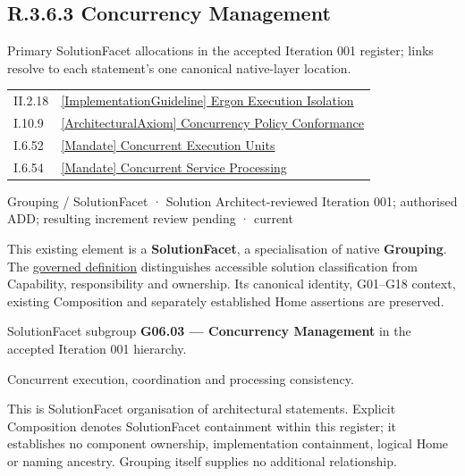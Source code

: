 \subsection*{R.3.6.3 Concurrency Management}
\label{navigation:R.3.6.3}

Primary SolutionFacet allocations in the accepted Iteration 001 register; links resolve to each statement’s one canonical native-layer location.\par
\begin{longtable}{p{.22\linewidth}p{.73\linewidth}}
II.2.18 & \hyperref[element:4332542fe3c54af9ba07220d255de9c2]{[ImplementationGuideline] Ergon Execution Isolation} \\
I.10.9 & \hyperref[element:7e3b05a2e3e547cbbd26b1e181af0d10]{[ArchitecturalAxiom] Concurrency Policy Conformance} \\
I.6.52 & \hyperref[element:12466ce2701146c1b52a9c68c2fb426c]{[Mandate] Concurrent Execution Units} \\
I.6.54 & \hyperref[element:338a4cb1c2444ec2aa7703fcd9f28247]{[Mandate] Concurrent Service Processing} \\
\end{longtable}
\label{element:9536aaf4114b4c35b8a795383d442f64}
{\small Grouping / SolutionFacet · Solution Architect-reviewed Iteration 001; authorised ADD; resulting increment review pending · current}\par

This existing element is a \textbf{SolutionFacet}, a specialisation of native
\textbf{Grouping}. The \href{\detokenize{../../../../../../../governance/continuum-representation.md#solutionfacet-classification--1119-candidate}}{governed definition}
distinguishes accessible solution classification from Capability, responsibility
and ownership. Its canonical identity, G01–G18 context, existing Composition
and separately established Home assertions are preserved.



SolutionFacet subgroup \textbf{G06.03 — Concurrency Management} in the accepted Iteration 001 hierarchy.



Concurrent execution, coordination and processing consistency.



This is SolutionFacet organisation of architectural statements. Explicit Composition denotes SolutionFacet containment within this register; it establishes no component ownership, implementation containment, logical Home or naming ancestry. Grouping itself supplies no additional relationship.


